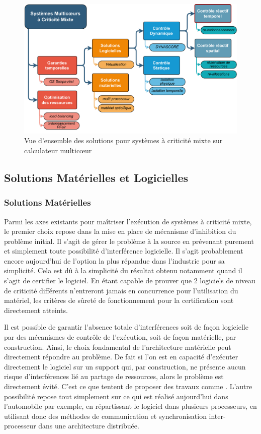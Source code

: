 \documentclass[french, a4paper, 11pt, twoside, pdftex]{StyleThese}
\begin{document}
    \begin{figure}[ht]
    	\centering
    	\includegraphics[width=\linewidth]{schemas/StateOfTheArt_plan}
    	\captionsetup{justification=centering}
    	\caption{Vue d'ensemble des solutions pour systèmes à criticité mixte sur calculateur multicœur}
    	\label{fig:stateoftheartsituation}
    \end{figure}

    \subsection{Solutions Matérielles et Logicielles}
    
    \subsubsection{Solutions Matérielles}
    Parmi les axes existants pour maîtriser l'exécution de systèmes à criticité mixte, le premier choix repose dans la mise en place de mécanisme d'inhibition du problème initial. Il s'agit de gérer le problème à la source en prévenant purement et simplement toute possibilité d'interférence logicielle. Il s'agit probablement encore aujourd'hui de l'option la plus répandue dans l'industrie pour sa simplicité. Cela est dû à la simplicité du résultat obtenu notamment quand il s'agit de certifier le logiciel. En étant capable de prouver que 2 logiciels de niveau de criticité différents n'entreront jamais en concurrence pour l'utilisation du matériel, les critères de sûreté de fonctionnement pour la certification sont directement atteints.
    
    Il est possible de garantir l'absence totale d'interférences soit de façon logicielle par des mécanismes de contrôle de l'exécution, soit de façon matérielle, par construction. Ainsi, le choix fondamental de l'architecture matérielle peut directement répondre au problème. De fait si l'on est en capacité d'exécuter directement le logiciel sur un support qui, par construction, ne présente aucun risque d'interférences lié au partage de ressources, alors le problème est directement évité. C'est ce que tentent de proposer des travaux comme \cite{schoeberl_towards_2011}. L'autre possibilité repose tout simplement sur ce qui est réalisé aujourd'hui dans l'automobile par exemple, en répartissant le logiciel dans plusieurs processeurs, en utilisant donc des méthodes de communication et synchronisation inter-processeur dans une architecture distribuée.
    
\end{document}
